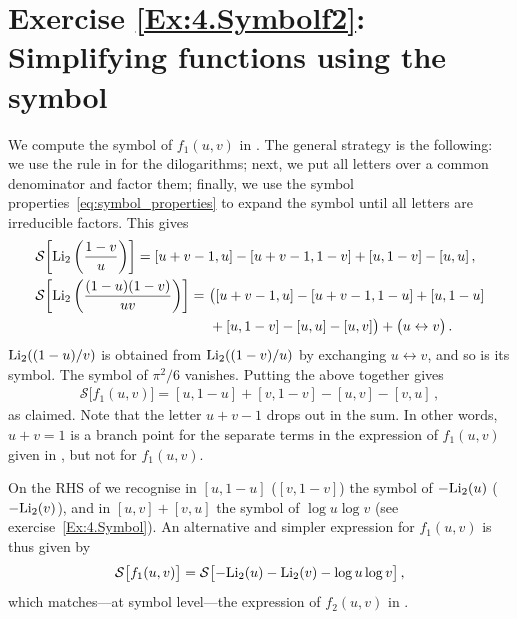 \section*{Exercise \ref{Ex:4.Symbolf2}: Simplifying functions using the symbol}
\label{Sol:4.Symbolf2}
%
We compute the symbol of $f_1(u,v)$ in . The general strategy is the following:
we use the rule in  for the dilogarithms; next, we put all letters over a common denominator and factor them; finally, we use the symbol properties~\eqref{eq:symbol_properties} to expand the symbol until all letters are irreducible factors.
This gives
\begin{align}
& \mathcal{S}\biggl[ {\rm Li}_2\left(\frac{1-v}{u}\right) \biggr] = [u+v-1,u] - [u+v-1, 1-v] + [u,1-v] - [u,u] \,, \\
& \begin{aligned}
\mathcal{S}\biggl[ {\rm Li}_2\left(\frac{(1-u)(1-v)}{u v}\right) \biggr] = \ & \bigl( [u+v-1,u]-[u+v-1,1-u]+[u,1-u] \\
&  +[u,1-v]-[u,u]-[u,v] \bigr) + \bigl(u \leftrightarrow v \bigr) \,.
\end{aligned} \end{align}
${\rm Li}_2((1-u)/v)$ is obtained from ${\rm Li}_2((1-v)/u)$ by exchanging $u \leftrightarrow v$, and so is its symbol. The symbol of $\pi^2/6$ vanishes.
Putting the above together gives
\begin{align} \label{eq:Sf1}
\mathcal{S}\bigl[ f_1(u,v) \bigr] = [u, 1 - u] + [v, 1 - v] - [u, v] - [v, u] \,,
\end{align}
as claimed. Note that the letter $u+v-1$ drops out in the sum. In other words, $u+v=1$ is a branch point for the separate terms in the expression of $f_1(u,v)$ given in , but not for $f_1(u,v)$.

On the RHS of  we recognise in $ [u, 1 - u] $ ($[v, 1 - v]$) the symbol of $-{\rm Li}_2(u)$ ($-{\rm Li}_2(v)$), 
and in $[u, v] + [v, u]$ the symbol of $\log u \log v$ (see exercise~\ref{Ex:4.Symbol}). 
An alternative and simpler expression for $f_1(u,v)$ is thus given by
\begin{align}
\mathcal{S}\bigl[f_1(u,v)\bigr] =\mathcal{S}\bigl[  -{\rm Li}_2(u) -{\rm Li}_2(v) - \log u \log v \bigr] \,,
\end{align}
which matches---at symbol level---the expression of $f_2(u,v)$ in .



